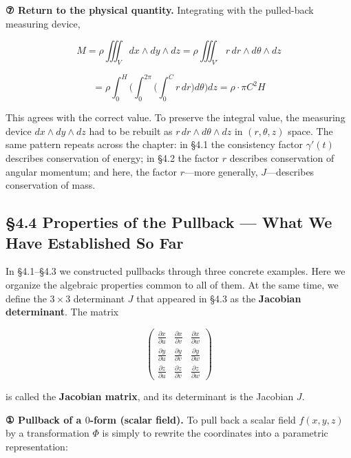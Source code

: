 \documentclass[a4paper,12pt,openany]{book}
\begin{document}
\textbf{⑦ Return to the physical quantity.} Integrating with the
pulled-back measuring device,

\[
M
=
\rho\iiint_V dx\wedge dy\wedge dz
=
\rho\iiint_{V'} r\,dr\wedge d\theta\wedge dz
\]

\[
=
\rho
\int_0^H
\biggl(
  \int_0^{2\pi}
  \biggl(
    \int_0^C r\,dr
  \biggr)
  d\theta
\biggr)
dz
=
\rho\cdot\pi C^2H
\]

This agrees with the correct value. To preserve the integral value, the
measuring device \(dx \wedge dy \wedge dz\) had to be rebuilt as
\(r\,dr \wedge d\theta \wedge dz\) in \((r,\theta,z)\) space. The same
pattern repeats across the chapter: in §4.1 the consistency factor
\(\gamma'(t)\) describes conservation of energy; in §4.2 the factor
\(r\) describes conservation of angular momentum; and here, the factor
\(r\)—more generally, \(J\)—describes conservation of mass.

\par\vspace{0.35em}\par

\hypertarget{properties-of-the-pullback-what-we-have-established-so-far}{%
\subsection{§4.4 Properties of the Pullback — What We Have Established
So
Far}\label{properties-of-the-pullback-what-we-have-established-so-far}}

In §4.1–§4.3 we constructed pullbacks through three concrete examples.
Here we organize the algebraic properties common to all of them. At the
same time, we define the \(3 \times 3\) determinant \(J\) that appeared
in §4.3 as the \textbf{Jacobian determinant}. The matrix

\[\begin{pmatrix}
\frac{\partial x}{\partial u} & \frac{\partial x}{\partial v} & \frac{\partial x}{\partial w} \\[4pt]
\frac{\partial y}{\partial u} & \frac{\partial y}{\partial v} & \frac{\partial y}{\partial w} \\[4pt]
\frac{\partial z}{\partial u} & \frac{\partial z}{\partial v} & \frac{\partial z}{\partial w}
\end{pmatrix}\]

is called the \textbf{Jacobian matrix}, and its determinant is the
Jacobian \(J\).

\textbf{① Pullback of a $0$-form (scalar field).} To pull back a scalar
field \(f(x,y,z)\) by a transformation \(\Phi\) is simply to rewrite the
coordinates into a parametric representation:
\end{document}
